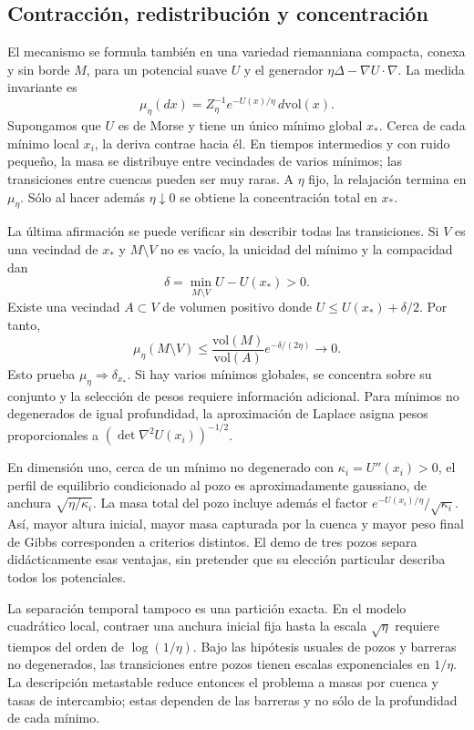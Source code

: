 \documentclass[11pt,a4paper]{article}
\theoremstyle{remark}\newtheorem{remark}{Observación}
\begin{document}
\subsection{Contracción, redistribución y concentración}
El mecanismo se formula también en una variedad riemanniana compacta, conexa y sin borde $M$, para un potencial suave $U$ y el generador $\eta\Delta-\nabla U\cdot\nabla$. La medida invariante es
\[
 \mu_\eta(dx)=Z_\eta^{-1}e^{-U(x)/\eta}\,d\mathrm{vol}(x).
\]
Supongamos que $U$ es de Morse y tiene un único mínimo global $x_*$. Cerca de cada mínimo local $x_i$, la deriva contrae hacia él. En tiempos intermedios y con ruido pequeño, la masa se distribuye entre vecindades de varios mínimos; las transiciones entre cuencas pueden ser muy raras. A $\eta$ fijo, la relajación termina en $\mu_\eta$. Sólo al hacer además $\eta\downarrow0$ se obtiene la concentración total en $x_*$.

La última afirmación se puede verificar sin describir todas las transiciones. Si $V$ es una vecindad de $x_*$ y $M\setminus V$ no es vacío, la unicidad del mínimo y la compacidad dan
\[
 \delta=\min_{M\setminus V}U-U(x_*)>0.
\]
Existe una vecindad $A\subset V$ de volumen positivo donde $U\leq U(x_*)+\delta/2$. Por tanto,
\[
 \mu_\eta(M\setminus V)
 \leq\frac{\mathrm{vol}(M)}{\mathrm{vol}(A)}
 e^{-\delta/(2\eta)}\longrightarrow0.
\]
Esto prueba $\mu_\eta\Rightarrow\delta_{x_*}$. Si hay varios mínimos globales, se concentra sobre su conjunto y la selección de pesos requiere información adicional. Para mínimos no degenerados de igual profundidad, la aproximación de Laplace asigna pesos proporcionales a $(\det\nabla^2U(x_i))^{-1/2}$.

En dimensión uno, cerca de un mínimo no degenerado con $\kappa_i=U''(x_i)>0$, el perfil de equilibrio condicionado al pozo es aproximadamente gaussiano, de anchura $\sqrt{\eta/\kappa_i}$. La masa total del pozo incluye además el factor $e^{-U(x_i)/\eta}/\sqrt{\kappa_i}$. Así, mayor altura inicial, mayor masa capturada por la cuenca y mayor peso final de Gibbs corresponden a criterios distintos. El demo de tres pozos separa didácticamente esas ventajas, sin pretender que su elección particular describa todos los potenciales.

La separación temporal tampoco es una partición exacta. En el modelo cuadrático local, contraer una anchura inicial fija hasta la escala $\sqrt\eta$ requiere tiempos del orden de $\log(1/\eta)$. Bajo las hipótesis usuales de pozos y barreras no degenerados, las transiciones entre pozos tienen escalas exponenciales en $1/\eta$. La descripción metastable reduce entonces el problema a masas por cuenca y tasas de intercambio; estas dependen de las barreras y no sólo de la profundidad de cada mínimo.
\end{document}
